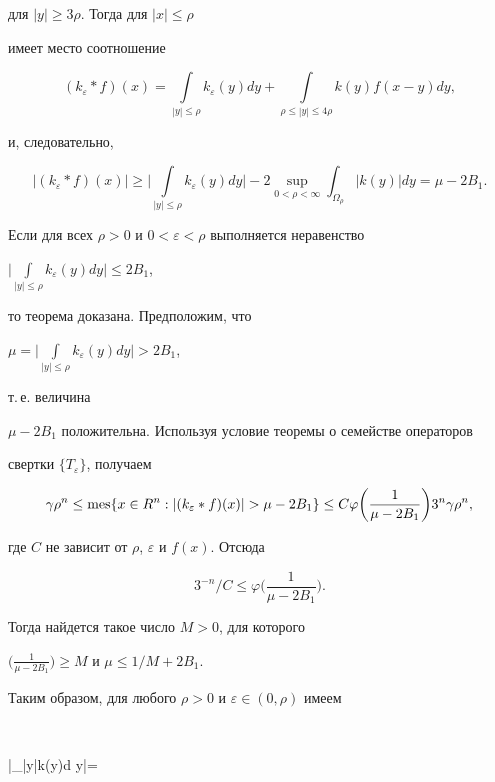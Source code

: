 для $|y|\ge3\rho$. Тогда для $|x|\le\rho$ 


имеет место соотношение 


$$ 


(k_\varepsilon*f)(x)=\int\limits_{|y|\le\rho} 


k_\varepsilon(y)d y+\int\limits_{\rho\le|y|\le4\rho} 


k(y)f(x-y)d y, 


$$ 


и, следовательно, 


$$ 


|(k_\varepsilon*f)(x)|\ge\bigg|\int\limits_{|y|\le\rho} 


k_\varepsilon(y)d y\bigg|-2\sup_{0<\rho<\infty} 


\int_{\Omega_\rho}|k(y)|d y=\mu-2B_1. 


$$ 


Если для всех $\rho>0$ и $0<\varepsilon<\rho$ выполняется неравенство 


$\big|\int\limits_{|y|\le\rho} k_\varepsilon(y)d y\big|\le2B_1$, 


то теорема доказана. Предположим, что 


$\mu=\big|\int\limits_{|y|\le\rho} k_\varepsilon(y)d y\big|>2B_1$, 


т.\,е. величина 


$\mu-2B_1$ положительна. Используя условие теоремы о семействе операторов 


свертки $\{T_\varepsilon\}$, получаем 


$$ 


\gamma\rho^n\le\mes\{x\in R^n:|(k_\varepsilon*f)(x)|>\mu-2B_1\}\le 


C\varphi\bigg(\frac{1}{\mu-2B_1} \bigg)3^n\gamma\rho^n, 


$$ 


где $C$ не зависит от $\rho$, $\varepsilon$ и $f(x)$. Отсюда 


$$ 


3^{-n}/C\le\varphi\bigg(\frac{1}{\mu-2B_1} \bigg). 


$$ 


Тогда найдется такое число $M>0$, для которого 


$\big(\frac{1}{\mu-2B_1}\big)\ge M$ и $\mu\le 1/M+2B_1$. 


Таким образом, для любого $\rho>0$ и $\varepsilon\in(0,\rho)$ имеем 


$$ 


\bigg|\int\limits_{\varepsilon\le|y|\le\rho}k(y)d y\bigg|= 


